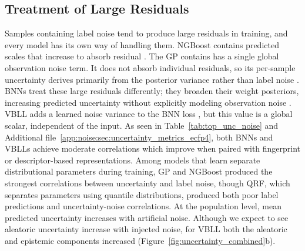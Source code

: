 \begin{table}[htbp]
\caption[Strongest and weakest uncertainty--noise correlations on QM9.]{Model--representation combinations with the strongest and weakest correlations between predicted uncertainty and injected noise on the QM9 HOMO--LUMO gap under Gaussian noise. Unc-Noise $\rho$ is the Spearman correlation between predicted uncertainty and the magnitude of the injected noise $|\epsilon|$, and Unc-Error $\rho$ is the Spearman correlation between predicted uncertainty and the absolute prediction error. ECE is the expected calibration error, for which lower values indicate better calibration, and Cov.\ $1\sigma$ and Cov.\ $2\sigma$ are the empirical coverages of the $1\sigma$ and $2\sigma$ intervals, whose nominal values are 68\% and 95\%. The upper block lists the combinations with the highest Unc-Noise $\rho$ and the lower block those with the lowest. Bold marks the highest Unc-Noise $\rho$ for the GP and for NGBoost, and the best Unc-Error $\rho$ and ECE. GP = Gaussian process, BNN = Bayesian neural network, VBLL = Variational Bayesian Last Layer, SNS = Sort \& Slice, ECFP4 = extended-connectivity fingerprint of diameter four, PDV = physicochemical descriptor vector, MHG-GNN = Molecular Hypergraph Grammar graph neural network.}
\label{tab:top_unc_noise}
\end{table}

\subsection{Treatment of Large Residuals}

Samples containing label noise tend to produce large residuals in training, and every model has its own way of handling them. NGBoost contains predicted scales that increase to absorb residual \citep{Duan2020}. The GP contains has a single global observation noise term. It does not absorb individual residuals, so its per-sample uncertainty derives primarily from the posterior variance rather than label noise  \citep{Rasmussen2005, Obrezanova2007}. BNNs treat these large residuals differently; they broaden their weight posteriors, increasing predicted uncertainty without explicitly modeling observation noise \citep{gal2016, kendall2017}. VBLL adds a learned noise variance to the BNN loss \citep{Harrison2024}, but this value is a global scalar, independent of the input. As seen in Table~\ref{tab:top_unc_noise} and Additional file~\ref{app:noise:sec:uncertainty_metrics_ecfp4}, both BNNs and VBLLs achieve moderate correlations which improve when paired with fingerprint or descriptor-based representations. Among models that learn separate distributional parameters during training, GP and NGBoost produced the strongest correlations between uncertainty and label noise, though QRF, which separates parameters using quantile distributions, produced both poor label predictions and uncertainty-noise correlations. At the population level, mean predicted uncertainty increases with artificial noise. Although we expect to see aleatoric uncertainty increase with injected noise, for VBLL both the aleatoric and epistemic components increased (Figure~\ref{fig:uncertainty_combined}b).


